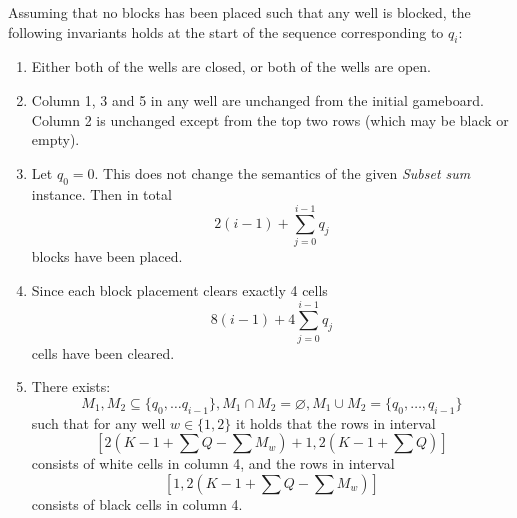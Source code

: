 Assuming that no blocks has been placed such that any well is blocked, the following invariants holds at the start of the sequence corresponding to $q_i$:

\begin{enumerate}
\item Either both of the wells are closed, or both of the wells are open.

\item Column 1, 3 and 5 in any well are unchanged from the initial gameboard. Column 2 is unchanged except from the top two rows (which may be black or empty).

\item Let $q_0 = 0$. This does not change the semantics of the given \textit{Subset sum} instance. Then in total 
\begin{equation*}
    2 \left( i-1 \right) + \sum_{j=0}^{i-1} q_j
\end{equation*}
blocks have been placed.

\item Since each block placement clears exactly 4 cells
\begin{equation*}
    8 \left( i-1 \right) + 4 \sum_{j=0}^{i-1} q_j
\end{equation*}
cells have been cleared.

\item There exists: 
    \begin{equation*}
        M_1, M_2 \subseteq \{q_0, \ldots q_{i-1}\}, M_1 \cap M_2 = \varnothing, M_1 \cup M_2 = \{q_0, \ldots, q_{i-1}\}
    \end{equation*}
such that for any well $w \in \{1,2\}$ it holds that the rows in interval
    \begin{equation*}
        \left[ 2 \left( K-1 + \sum Q - \sum M_w \right) +1, 2 \left( K-1 + \sum Q \right) \right]
    \end{equation*}
consists of white cells in column 4, and the rows in interval
    \begin{equation*}
        \left[ 1, 2 \left( K-1 + \sum Q - \sum M_w \right) \right]
    \end{equation*}
consists of black cells in column 4.
\end{enumerate}

